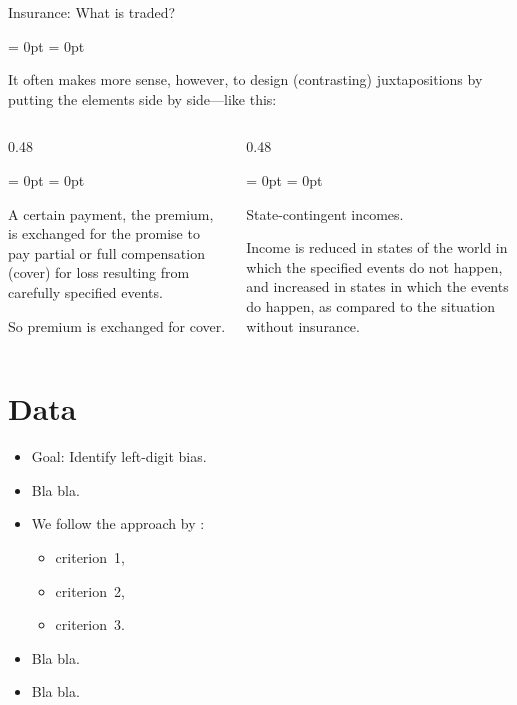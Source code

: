 \documentclass[aspectratio = 169, t, 10pt]{beamer}
\let \cite \textcite
\begin{document}
\begin{frame}{Insurance: What is traded?}

\begin{list}{}{\leftmargin = 0pt \itemindent = 0pt}
	\item It often makes more sense, however, to design (contrasting) juxtapositions by putting the elements side by side---like this:
\end{list}
\vspace{-\baselineskip}%
\begin{columns}[onlytextwidth, t]
	\begin{column}{0.48\textwidth}
		\begin{list}{}{\leftmargin = 0pt \itemindent = 0pt}
			\item {}
			\item A certain payment, the premium, is exchanged for the promise to pay partial or full compensation (cover) for loss resulting from carefully specified events.
			\item So premium is exchanged for cover.
		\end{list}
	\end{column}
	\begin{column}{0.48\textwidth}
		\begin{list}{}{\leftmargin = 0pt \itemindent = 0pt}
			\item {}
			\item State-contingent incomes.
			\item Income is reduced in states of the world in which the specified events do not happen, and increased in states in which the events do happen, as compared to the situation without insurance.
			\end{list}
	\end{column}
\end{columns}

\end{frame}


\section{Data}


\begin{frame}{\insertsection}

\begin{itemize}
	\item Goal: Identify left-digit bias.
	\item Bla bla.
	\item We follow the approach by \cite{companion}:
	\begin{itemize}
		\item criterion~1,
		\item criterion~2,
		\item criterion~3.
	\end{itemize}
	\item Bla bla.
	\item Bla bla.
\end{itemize}

\end{frame}
\end{document}
